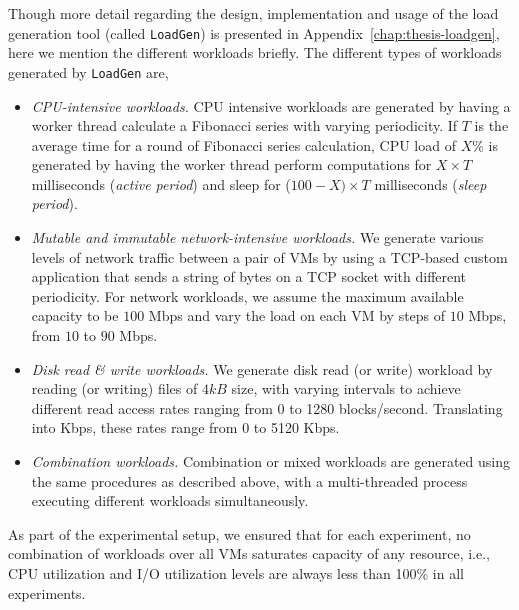 Though more detail regarding the design, implementation
and usage of the load generation tool (called \texttt{LoadGen})
is presented in Appendix~\ref{chap:thesis-loadgen}, here 
we mention the different workloads briefly.
The different types of workloads generated by \texttt{LoadGen} are,
% 
\begin{itemize}
\item \emph{CPU-intensive workloads.}
CPU intensive workloads are generated by having a worker
thread calculate a Fibonacci series with varying periodicity.
If $T$ is the average time for a round of Fibonacci series calculation,
CPU load of $X\%$ is generated by having the worker thread perform
computations for $X \times T$ milliseconds (\emph{active period}) and
sleep for ($100-X) \times T$ milliseconds (\emph{sleep period}).
\item \emph{Mutable and immutable network-intensive workloads.} 
We generate various levels of network traffic between a pair of VMs by using
a TCP-based custom application that sends a string of bytes on a
TCP socket with different periodicity.
For network workloads, we assume the maximum available capacity 
to be $100$ Mbps and vary the load on each VM by steps 
of $10$ Mbps, from $10$ to $90$ Mbps.
\item \emph{Disk read \& write workloads.}
We generate disk read (or write) workload by reading (or writing) files  
of $4 kB$ size, with varying intervals to achieve different read access
rates ranging from 0 to 1280 blocks/second. Translating into Kbps, these
rates range from 0 to 5120 Kbps.
\item \emph{Combination workloads.}
Combination or mixed workloads are generated using 
the same procedures as described above, with a 
multi-threaded process executing different workloads 
simultaneously.
\end{itemize}
As part of the experimental setup, we ensured that for each 
experiment, no combination of workloads over all VMs 
saturates capacity of any resource, i.e., CPU utilization and 
I/O utilization levels are always less than 100\% in all experiments.

